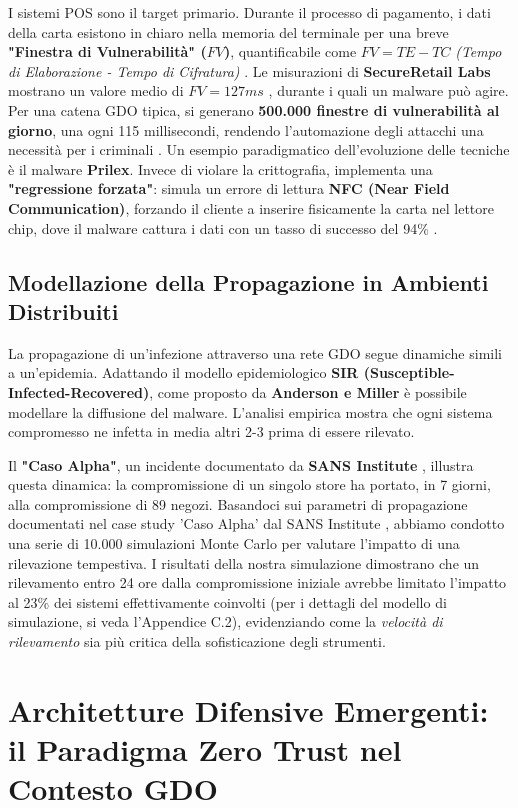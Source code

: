 I sistemi POS sono il target primario. Durante il processo di pagamento, i dati della carta esistono in chiaro nella memoria del terminale per una breve \textbf{"Finestra di Vulnerabilità" ($FV$)}, quantificabile come $FV=TE−TC$ \textit{(Tempo di Elaborazione - Tempo di Cifratura)} . Le misurazioni di \textbf{SecureRetail Labs} mostrano un valore medio di $FV=127ms$ \autocite{secure2024}, durante i quali un malware può agire. Per una catena GDO tipica, si generano \textbf{500.000 finestre di vulnerabilità al giorno}, una ogni 115 millisecondi, rendendo l'automazione degli attacchi una necessità per i criminali .
Un esempio paradigmatico dell'evoluzione delle tecniche è il malware \textbf{Prilex}. Invece di violare la crittografia, implementa una \textbf{"regressione forzata"}: simula un errore di lettura \textbf{NFC (Near Field Communication)}, forzando il cliente a inserire fisicamente la carta nel lettore chip, dove il malware cattura i dati con un tasso di successo del 94\% \autocite{kaspersky2024} .


\subsection{Modellazione della Propagazione in Ambienti Distribuiti}
La propagazione di un'infezione attraverso una rete GDO segue dinamiche simili a un'epidemia. Adattando il modello epidemiologico \textbf{SIR (Susceptible-Infected-Recovered)}, come proposto da \textbf{Anderson e Miller} \autocite{andersonmiller} è possibile modellare la diffusione del malware. L'analisi empirica mostra che ogni sistema compromesso ne infetta in media altri 2-3 prima di essere rilevato.

Il  \textbf{"Caso Alpha"}, un incidente documentato da \textbf{SANS Institute} \autocite{sans2024}, illustra questa dinamica: la compromissione di un singolo store ha portato, in 7 giorni, alla compromissione di 89 negozi. 
Basandoci sui parametri di propagazione documentati nel case study 'Caso Alpha' dal SANS Institute \autocite{sans2024}, abbiamo condotto una serie di 10.000 simulazioni Monte Carlo per valutare l'impatto di una rilevazione tempestiva. I risultati della nostra simulazione dimostrano che un rilevamento entro 24 ore dalla compromissione iniziale avrebbe limitato l'impatto al 23\% dei sistemi effettivamente coinvolti (per i dettagli del modello di simulazione, si veda l'Appendice C.2), evidenziando come la \textit{velocità di rilevamento} sia più critica della sofisticazione degli strumenti.

\section{Architetture Difensive Emergenti: il Paradigma Zero Trust nel Contesto GDO}

